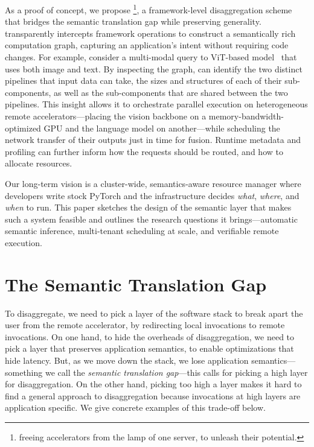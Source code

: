 As a proof of concept, we propose \sys\footnote{freeing accelerators from the lamp of one server, to unleash their potential.}, 
a framework-level disaggregation scheme that 
  bridges the semantic translation gap while preserving generality.
\sys transparently intercepts framework operations to construct a seman\-tically rich computation graph, capturing an application's intent without requiring code changes. 
For example, consider a multi-modal query to ViT-based model~\cite{vit} that uses both image and text.
By inspecting the graph, \sys can identify the two distinct pipelines that input data can take, the sizes and structures of each of their sub-components, as well as the sub-components that are shared between the two pipelines.
This insight allows it to orchestrate parallel execution on heterogeneous remote accelerators---placing the vision backbone on a memory-bandwidth-optimized GPU 
and the language model on another---while scheduling the network transfer of their outputs just in time for fusion.
Runtime metadata and profiling can further inform how the requests should be routed, and how to allocate resources.

Our long-term vision is a cluster-wide, semantics-aware resource manager where developers write stock PyTorch and the infrastructure decides 
\emph{what}, \emph{where}, and \emph{when} to run.  
This paper sketches the design of the semantic layer that makes such a system feasible and outlines the research questions it brings---automatic semantic inference, multi-tenant scheduling at scale, and verifiable remote execution.

\section{The Semantic Translation Gap}
\label{sec:translation}

To disaggregate, we need to pick a layer of 
  the software stack to break apart the user from the remote
  accelerator, by redirecting local invocations to remote
  invocations.
On one hand, to hide the overheads of disaggregation,
  we need to pick a
  layer that preserves application semantics, to enable
  optimizations that hide latency.
But, as we move down the stack, we lose application semantics---something
  we call the \emph{semantic translation gap}---this calls for picking
  a high layer for disaggregation.
On the other hand, picking too high a layer makes it hard to find
  a general approach to disaggregation because invocations at
  high layers are application specific.
We give concrete examples of this trade-off below.

